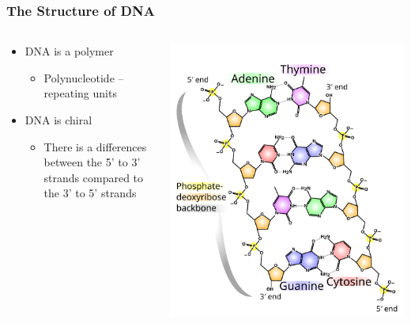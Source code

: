 \documentclass{beamer}
\begin{document}
	
	
	\begin{frame}
		\frametitle{The Structure of DNA}
		\begin{columns}
			\begin{column}{0.5\textwidth}
				
				\small		
				\begin{itemize}
					\item DNA is a polymer
					\begin{itemize}
						
						\item	Polynucleotide – repeating units
					\end{itemize}
					\item	DNA is chiral
					\begin{itemize}
						\item[] There is a differences between the 5' to 3' strands compared to the 3' to 5' strands
					\end{itemize}
				\end{itemize}
				
				
			\end{column}
			\begin{column}{0.6\textwidth}
				\centering \includegraphics[keepaspectratio, width  =\textwidth]{img/DNA_chemistry}  
				
			\end{column}
		\end{columns}
	\end{frame}
	
\end{document}
